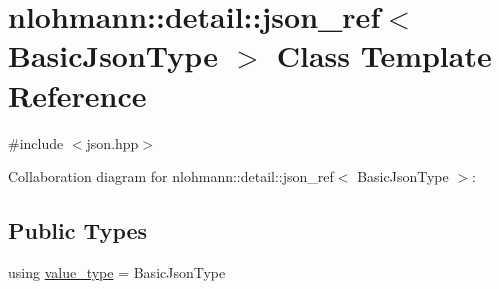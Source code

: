 \hypertarget{classnlohmann_1_1detail_1_1json__ref}{}\section{nlohmann\+:\+:detail\+:\+:json\+\_\+ref$<$ Basic\+Json\+Type $>$ Class Template Reference}
\label{classnlohmann_1_1detail_1_1json__ref}


{\ttfamily \#include $<$json.\+hpp$>$}



Collaboration diagram for nlohmann\+:\+:detail\+:\+:json\+\_\+ref$<$ Basic\+Json\+Type $>$\+:
\subsection*{Public Types}
\begin{DoxyCompactItemize}
\item 
using \hyperlink{classnlohmann_1_1detail_1_1json__ref_a78d76cf288141049568c0d670ed670ef}{value\+\_\+type} = Basic\+Json\+Type
\end{DoxyCompactItemize}
